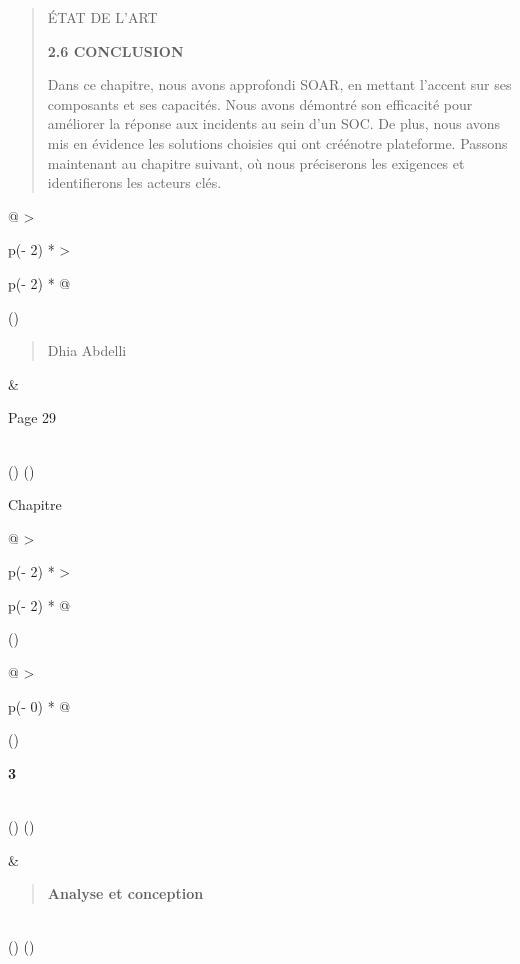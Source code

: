 \documentclass[
]{article}
\begin{document}
\begin{quote}
ÉTAT DE L'ART

\textbf{2.6 CONCLUSION}

Dans ce chapitre, nous avons approfondi SOAR, en mettant l'accent sur
ses composants et ses capacités. Nous avons démontré son efficacité pour
améliorer la réponse aux incidents au sein d'un SOC. De plus, nous avons
mis en évidence les solutions choisies qui ont créénotre plateforme.
Passons maintenant au chapitre suivant, où nous préciserons les
exigences et identifierons les acteurs clés.
\end{quote}

\begin{longtable}[]{@{}
  >{\raggedright\arraybackslash}p{(\columnwidth - 2\tabcolsep) * }
  >{\raggedright\arraybackslash}p{(\columnwidth - 2\tabcolsep) * }@{}}
\toprule()
\begin{minipage}[b]{\linewidth}\raggedright
\begin{quote}
Dhia Abdelli
\end{quote}
\end{minipage} & \begin{minipage}[b]{\linewidth}\raggedright
Page 29
\end{minipage} \\
\midrule()
\endhead
\bottomrule()
\end{longtable}

Chapitre

\begin{longtable}[]{@{}
  >{\raggedright\arraybackslash}p{(\columnwidth - 2\tabcolsep) * }
  >{\raggedright\arraybackslash}p{(\columnwidth - 2\tabcolsep) * }@{}}
\toprule()
\begin{minipage}[b]{\linewidth}\raggedright
\begin{longtable}[]{@{}
  >{\raggedright\arraybackslash}p{(\columnwidth - 0\tabcolsep) * }@{}}
\toprule()
\begin{minipage}[b]{\linewidth}\raggedright
\textbf{3}
\end{minipage} \\
\midrule()
\endhead
\bottomrule()
\end{longtable}
\end{minipage} & \begin{minipage}[b]{\linewidth}\raggedright
\begin{quote}
\textbf{Analyse et conception}
\end{quote}
\end{minipage} \\
\midrule()
\endhead
\bottomrule()
\end{longtable}
\end{document}
